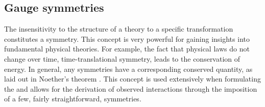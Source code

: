 \subsection{Gauge symmetries}
\label{sec:gaugeSymmetries}

The insensitivity to the structure of a theory to a specific
transformation constitutes a symmetry. This concept is very powerful
for gaining insights into fundamental physical theories. For example,
the fact that physical laws do not change over time,
time-translational symmetry, leads to the conservation of energy.  In
general, any symmetries have a corresponding conserved quantity, as
laid out in Noether's theorem \cite{1971TTSP....1..186N}. This concept
is used extensively when formulating the \SM and allows for the
derivation of observed interactions through the imposition of a few,
fairly straightforward, symmetries.

